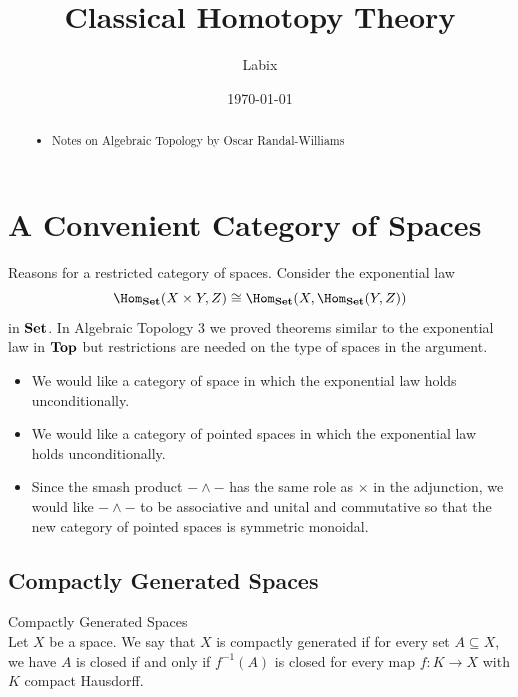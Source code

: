 \documentclass[a4paper]{article}
\title{Classical Homotopy Theory}
\author{Labix}
\date{\today}
\begin{document}
\maketitle
\begin{abstract}
\begin{itemize}
\item Notes on Algebraic Topology by Oscar Randal-Williams
\end{itemize}
\end{abstract}
\pagebreak
\tableofcontents

\pagebreak
\section{A Convenient Category of Spaces}
Reasons for a restricted category of spaces. Consider the exponential law $$\Hom_\bold{Set}(X\times Y,Z)\cong\Hom_\bold{Set}(X,\Hom_\bold{Set}(Y,Z))$$ in $\bold{Set}$. In Algebraic Topology 3 we proved theorems similar to the exponential law in $\bold{Top}$ but restrictions are needed on the type of spaces in the argument. 
\begin{itemize}
\item We would like a category of space in which the exponential law holds unconditionally. 
\item We would like a category of pointed spaces in which the exponential law holds unconditionally. 
\item Since the smash product $-\wedge-$ has the same role as $\times$ in the adjunction, we would like $-\wedge-$ to be associative and unital and commutative so that the new category of pointed spaces is symmetric monoidal. 
\end{itemize}

\subsection{Compactly Generated Spaces}
\begin{defn}{Compactly Generated Spaces}{}\\
Let $X$ be a space. We say that $X$ is compactly generated if for every set $A\subseteq X$, we have $A$ is closed if and only if $f^{-1}(A)$ is closed for every map $f:K\to X$ with $K$ compact Hausdorff. 
\end{defn}
\end{document}

